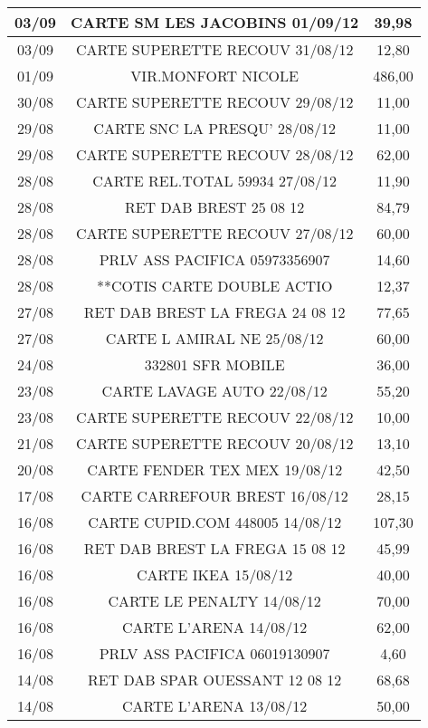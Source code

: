 \begin{longtable}{|c|c|c|}
\hline
03/09 & CARTE SM LES JACOBINS  01/09/12 & 39,98 \\
\hline
03/09 & CARTE SUPERETTE RECOUV 31/08/12 & 12,80 \\
\hline
01/09 & VIR.MONFORT NICOLE & 486,00 \\
\hline
30/08 & CARTE SUPERETTE RECOUV 29/08/12 & 11,00 \\
\hline
29/08 & CARTE SNC  LA PRESQU'  28/08/12 & 11,00 \\
\hline
29/08 & CARTE SUPERETTE RECOUV 28/08/12 & 62,00 \\
\hline
28/08 & CARTE REL.TOTAL 59934  27/08/12 & 11,90 \\
\hline
28/08 & RET DAB BREST          25 08 12 & 84,79 \\
\hline
28/08 & CARTE SUPERETTE RECOUV 27/08/12 & 60,00 \\
\hline
28/08 & PRLV   ASS PACIFICA  05973356907 & 14,60 \\
\hline
28/08 & **COTIS CARTE DOUBLE ACTIO & 12,37 \\
\hline
27/08 & RET DAB BREST LA FREGA 24 08 12 & 77,65 \\
\hline
27/08 & CARTE L AMIRAL NE      25/08/12 & 60,00 \\
\hline
24/08 & 332801 SFR MOBILE & 36,00 \\
\hline
23/08 & CARTE LAVAGE AUTO      22/08/12 & 55,20 \\
\hline
23/08 & CARTE SUPERETTE RECOUV 22/08/12 & 10,00 \\
\hline
21/08 & CARTE SUPERETTE RECOUV 20/08/12 & 13,10 \\
\hline
20/08 & CARTE FENDER TEX MEX   19/08/12 & 42,50 \\
\hline
17/08 & CARTE CARREFOUR BREST  16/08/12 & 28,15 \\
\hline
16/08 & CARTE CUPID.COM 448005 14/08/12 & 107,30 \\
\hline
16/08 & RET DAB BREST LA FREGA 15 08 12 & 45,99 \\
\hline
16/08 & CARTE IKEA             15/08/12 & 40,00 \\
\hline
16/08 & CARTE LE PENALTY       14/08/12 & 70,00 \\
\hline
16/08 & CARTE L'ARENA          14/08/12 & 62,00 \\
\hline
16/08 & PRLV   ASS PACIFICA  06019130907 & 4,60 \\
\hline
14/08 & RET DAB SPAR OUESSANT  12 08 12 & 68,68 \\
\hline
14/08 & CARTE L'ARENA          13/08/12 & 50,00 \\

\end{longtable}

